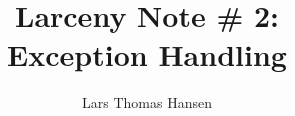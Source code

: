 %



\title{Larceny Note \# 2: \\
       Exception Handling}
\author{Lars Thomas Hansen}


\maketitle

